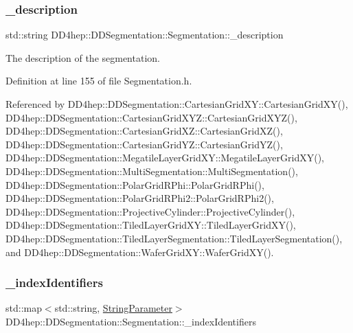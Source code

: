 \subsubsection{\texorpdfstring{\+\_\+description}{\_description}}
{\footnotesize\ttfamily std\+::string D\+D4hep\+::\+D\+D\+Segmentation\+::\+Segmentation\+::\+\_\+description\hspace{0.3cm}{\ttfamily [protected]}}



The description of the segmentation. 



Definition at line 155 of file Segmentation.\+h.



Referenced by D\+D4hep\+::\+D\+D\+Segmentation\+::\+Cartesian\+Grid\+X\+Y\+::\+Cartesian\+Grid\+X\+Y(), D\+D4hep\+::\+D\+D\+Segmentation\+::\+Cartesian\+Grid\+X\+Y\+Z\+::\+Cartesian\+Grid\+X\+Y\+Z(), D\+D4hep\+::\+D\+D\+Segmentation\+::\+Cartesian\+Grid\+X\+Z\+::\+Cartesian\+Grid\+X\+Z(), D\+D4hep\+::\+D\+D\+Segmentation\+::\+Cartesian\+Grid\+Y\+Z\+::\+Cartesian\+Grid\+Y\+Z(), D\+D4hep\+::\+D\+D\+Segmentation\+::\+Megatile\+Layer\+Grid\+X\+Y\+::\+Megatile\+Layer\+Grid\+X\+Y(), D\+D4hep\+::\+D\+D\+Segmentation\+::\+Multi\+Segmentation\+::\+Multi\+Segmentation(), D\+D4hep\+::\+D\+D\+Segmentation\+::\+Polar\+Grid\+R\+Phi\+::\+Polar\+Grid\+R\+Phi(), D\+D4hep\+::\+D\+D\+Segmentation\+::\+Polar\+Grid\+R\+Phi2\+::\+Polar\+Grid\+R\+Phi2(), D\+D4hep\+::\+D\+D\+Segmentation\+::\+Projective\+Cylinder\+::\+Projective\+Cylinder(), D\+D4hep\+::\+D\+D\+Segmentation\+::\+Tiled\+Layer\+Grid\+X\+Y\+::\+Tiled\+Layer\+Grid\+X\+Y(), D\+D4hep\+::\+D\+D\+Segmentation\+::\+Tiled\+Layer\+Segmentation\+::\+Tiled\+Layer\+Segmentation(), and D\+D4hep\+::\+D\+D\+Segmentation\+::\+Wafer\+Grid\+X\+Y\+::\+Wafer\+Grid\+X\+Y().

\hypertarget{class_d_d4hep_1_1_d_d_segmentation_1_1_segmentation_a55ce2740cffa420bb5ac2b7646e55d98}{}\label{class_d_d4hep_1_1_d_d_segmentation_1_1_segmentation_a55ce2740cffa420bb5ac2b7646e55d98} 
\subsubsection{\texorpdfstring{\+\_\+index\+Identifiers}{\_indexIdentifiers}}
{\footnotesize\ttfamily std\+::map$<$std\+::string, \hyperlink{namespace_d_d4hep_1_1_d_d_segmentation_a43a80cf70a60b3c858aca4fa463d8f7c}{String\+Parameter}$>$ D\+D4hep\+::\+D\+D\+Segmentation\+::\+Segmentation\+::\+\_\+index\+Identifiers\hspace{0.3cm}{\ttfamily [protected]}}



